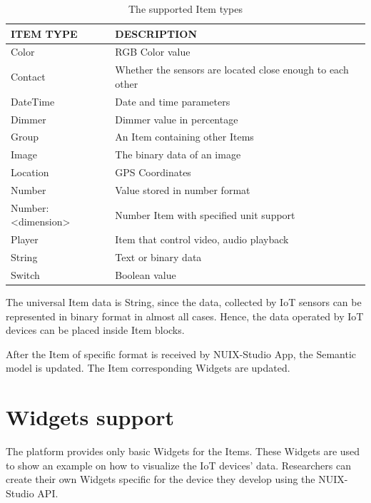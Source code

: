 \begin{table}
  \centering
  \begin{threeparttable}[c]
    \caption{The supported Item types}
    \label{tab:items-table}
    \begin{tabular}{ll}
      \toprule
      ITEM TYPE    &         DESCRIPTION                 \\
      \midrule
      Color &	RGB Color value \\
      Contact & Whether the sensors are located close enough to each other \\
      DateTime & Date and time parameters \\
      Dimmer &	Dimmer value in percentage \\
      Group &	An Item containing other Items \\
      Image &	The binary data of an image \\
      Location & GPS Coordinates \\
      Number & Value stored in number format \\
      Number:<dimension> & Number Item with specified unit support \\
      Player & Item that control video, audio playback \\
      String &	Text or binary data \\
      Switch & Boolean value \\
      \bottomrule
    \end{tabular}
  \end{threeparttable}
\end{table}

The universal Item data is String, since the data, collected by IoT sensors can be represented in binary format in almost all cases. Hence, the data operated by IoT devices can be placed inside Item blocks.

After the Item of specific format is received by NUIX-Studio App, the Semantic model is updated. The Item corresponding Widgets are updated.

\section{Widgets support}

The platform provides only basic Widgets for the Items. These Widgets are used to show an example on how to visualize the IoT devices' data. Researchers can create their own Widgets specific for the device they develop using the NUIX-Studio API.

